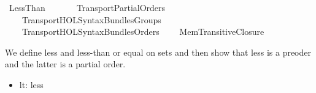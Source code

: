 %
\begin{isabellebody}%
%
%
\isadelimdocument
%
\endisadelimdocument
%
\isatagdocument
\isanewline
%
\isamarkuptrue%
%
\endisatagdocument
{\isafolddocument}%
%
\isadelimdocument
%
\endisadelimdocument
%
\isadelimtheory
%
\endisadelimtheory
%
\isatagtheory
{}\isamarkupfalse%
\ Less{\isacharunderscore}{\kern0pt}Than\isanewline
\ \ \isanewline
\ \ \ \ Transport{\isachardot}{\kern0pt}Partial{\isacharunderscore}{\kern0pt}Orders\isanewline
\ \ \ \ Transport{\isachardot}{\kern0pt}HOL{\isacharunderscore}{\kern0pt}Syntax{\isacharunderscore}{\kern0pt}Bundles{\isacharunderscore}{\kern0pt}Groups\isanewline
\ \ \ \ Transport{\isachardot}{\kern0pt}HOL{\isacharunderscore}{\kern0pt}Syntax{\isacharunderscore}{\kern0pt}Bundles{\isacharunderscore}{\kern0pt}Orders\isanewline
\ \ \ \ Mem{\isacharunderscore}{\kern0pt}Transitive{\isacharunderscore}{\kern0pt}Closure\isanewline
{}%
\endisatagtheory
{\isafoldtheory}%
%
\isadelimtheory
%
\endisadelimtheory
%
\isadelimdocument
%
\endisadelimdocument
%
\isatagdocument
%
\isamarkuptrue%
%
\endisatagdocument
{\isafolddocument}%
%
\isadelimdocument
%
\endisadelimdocument
%
\begin{isamarkuptext}%
We define less and less-than or equal on sets and then
show that less is a preoder and the latter is a partial order.%
\end{isamarkuptext}\isamarkuptrue%
%
\isadelimdocument
%
\endisadelimdocument
%
\isatagdocument
%
\isamarkuptrue%
%
\endisatagdocument
{\isafolddocument}%
%
\isadelimdocument
%
\endisadelimdocument
%
\begin{isamarkuptext}%
%
\begin{itemize}%
\item lt: less


\end{itemize}
\end{isamarkuptext}
\end{isabellebody}
